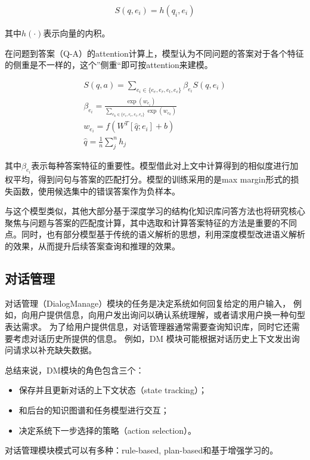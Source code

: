 \begin{gather}
	S(q, e_i)=h(q_i, e_i)
\end{gather}

其中$h(\cdot)$表示向量的内积。

在问题到答案（Q-A）的attention计算上，模型认为不同问题的答案对于各个特征的侧重是不一样的，这个”侧重“即可按attention来建模。

\begin{gather}
	S(q, a)=\sum_{e_i\in\{e_e, e_r, e_t, e_c\}}\beta_{e_{i}}S(q, e_{i}) \\
	\beta_{e_{i}}=\frac{\exp(w_{e_{i}})}{\sum_{e_k\in\{e_e, e_r, e_t, e_c\}}\exp(w_{e_{k}})} \\
	w_{e_i}=f(W^T[\hat{q};e_i]+b) \\
	\hat{q}=\frac{1}{n}\sum_{j}^{n}h_{j}
\end{gather}

其中$\beta_{e_{i}}$表示每种答案特征的重要性。模型借此对上文中计算得到的相似度进行加权平均，得到问句与答案的匹配打分。模型的训练采用的是max margin形式的损失函数，使用候选集中的错误答案作为负样本。

与这个模型类似，其他大部分基于深度学习的结构化知识库问答方法也将研究核心聚焦与问题与答案的匹配度计算，其中选取和计算答案特征的方法是重要的不同点。同时，也有部分模型基于传统的语义解析的思想，利用深度模型改进语义解析的效果，从而提升后续答案查询和推理的效果。


\subsection{对话管理}

对话管理（DialogManage）模块的任务是决定系统如何回复给定的用户输入，
例如，向用户提供信息，向用户发出询问以确认系统理解，或者请求用户换一种句型表达需求。
为了给用户提供信息，对话管理器通常需要查询知识库，同时它还需要考虑对话历史所提供的信息。
例如，DM 模块可能根据对话历史上下文发出询问请求以补充缺失数据。

总结来说，DM模块的角色包含三个：

\begin{itemize}
	\item 保存并且更新对话的上下文状态（state tracking）；
	\item 和后台的知识图谱和任务模型进行交互；
	\item 决定系统下一步选择的策略（action selection）。
\end{itemize}

对话管理模块模式可以有多种：rule-based, plan-based和基于增强学习的。

